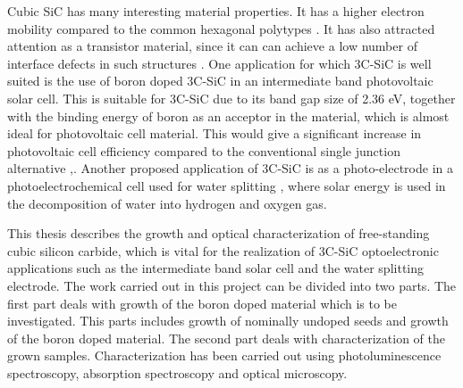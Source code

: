 Cubic SiC has many interesting material properties. It has a higher electron mobility compared to the common hexagonal polytypes \cite{Schoner2006}. It has also attracted attention as a transistor material, since it can can achieve a low number of interface defects in such structures \cite{Anzalone2015}. One application for which 3C-SiC is well suited is the use of boron doped 3C-SiC in an intermediate band photovoltaic solar cell. This is suitable for 3C-SiC due to its band gap size of 2.36 eV, together with the binding energy of boron as an acceptor in the material, which is almost ideal for photovoltaic cell material. This would give a significant increase in photovoltaic cell efficiency compared to the conventional single junction alternative \cite{Richards2003},\cite{Luque1997}. Another proposed application of 3C-SiC is as a photo-electrode in a photoelectrochemical cell used for water splitting \cite{Kato2014,Yasuda2012}, where solar energy is used in the decomposition of water into hydrogen and oxygen gas. 

This thesis describes the growth and optical characterization of free-standing cubic silicon carbide, which is vital for the realization of 3C-SiC optoelectronic applications such as the intermediate band solar cell and the water splitting electrode. The work carried out in this project can be divided into two parts. The first part deals with growth of the boron doped material which is to be investigated. This parts includes growth of nominally undoped seeds and growth of the boron doped material. The second part deals with characterization of the grown samples. Characterization has been carried out using photoluminescence spectroscopy, absorption spectroscopy and optical microscopy. 

